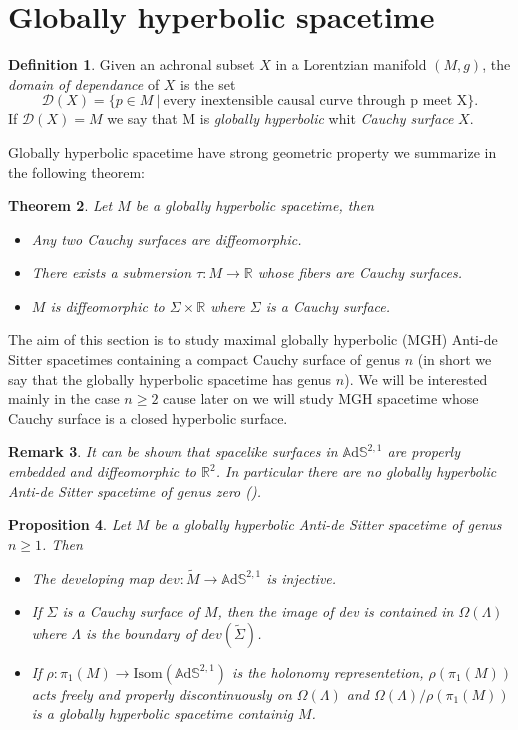 \documentclass[10pt,a4paper,oneside,reqno]{book}
\def\R{\mathbb{R}}
\def\A{\mathbb{A}\mathrm{d}\mathbb{S}}
\theoremstyle{plain}
\newtheorem{theorem}{Theorem}[chapter] %
\theoremstyle{definition}
\newtheorem{definition}[theorem]{Definition} %
\theoremstyle{plain}
\newtheorem{proposition}[theorem]{Proposition}
\theoremstyle{plain}
\newtheorem{observation}[theorem]{Remark}
\theoremstyle{mystyleNormalFont}
\begin{document}
\section{Globally hyperbolic spacetime}
\begin{definition}
    Given an achronal subset $X$ in a Lorentzian manifold $(M,g)$, the \textit{domain of dependance} of $X$ is the set
    \[
        \mathcal{D}(X)= \{ p \in M \ | \ \text{every inextensible causal curve through p meet X} \}.
    \]
    If $\mathcal{D}(X)=M$ we say that M is  \textit{globally hyperbolic} whit \textit{Cauchy surface} $X$.
\end{definition}
Globally hyperbolic spacetime have strong geometric property we summarize in the following theorem:
\begin{theorem}
    Let $M$ be a globally hyperbolic spacetime, then
    \begin{itemize}
        \item Any two Cauchy surfaces are diffeomorphic.
        \item There  exists a submersion $\tau : M \to \R$ whose fibers are Cauchy surfaces.
        \item $M$ is diffeomorphic to $\Sigma \times \R$ where $\Sigma$ is a Cauchy surface.
    \end{itemize}
\end{theorem}
The aim of this section is to study maximal globally hyperbolic (MGH) Anti-de Sitter spacetimes containing a compact Cauchy surface of genus $n$ (in short we say that the globally hyperbolic spacetime has genus $n$). We will be interested mainly in the case $n\geq 2$ cause later on we will study MGH spacetime whose Cauchy surface is a closed hyperbolic surface.\\ 
\begin{observation}
    It can be shown that spacelike surfaces in $\A^{2,1}$ are properly embedded and diffeomorphic to $\R^2$.
    In particular there are no globally hyperbolic Anti-de Sitter spacetime of genus zero (\cite{bonsanteseppi}).
\end{observation}
\begin{proposition}\label{GH_geometry}
    Let $M$ be a globally hyperbolic Anti-de Sitter spacetime of genus $n\geq 1$. Then
    \begin{itemize}
        \item The developing map $dev: \widetilde{M} \to\A^{2,1}$ is injective.
        \item If $\Sigma$ is a Cauchy surface of $M$, then the image of dev is contained in $\Omega(\Lambda)$ where $\Lambda$ is the boundary of $dev(\widetilde{\Sigma})$.
        \item If $\rho : \pi_1(M) \to \text{Isom}(\A^{2,1})$ is the holonomy representetion, $\rho(\pi_1(M))$ acts freely and properly discontinuously on $\Omega(\Lambda)$ and $\Omega(\Lambda) / \rho(\pi_1(M))$ is a globally hyperbolic spacetime containig $M$.
    \end{itemize}
\end{proposition}
\end{document}

